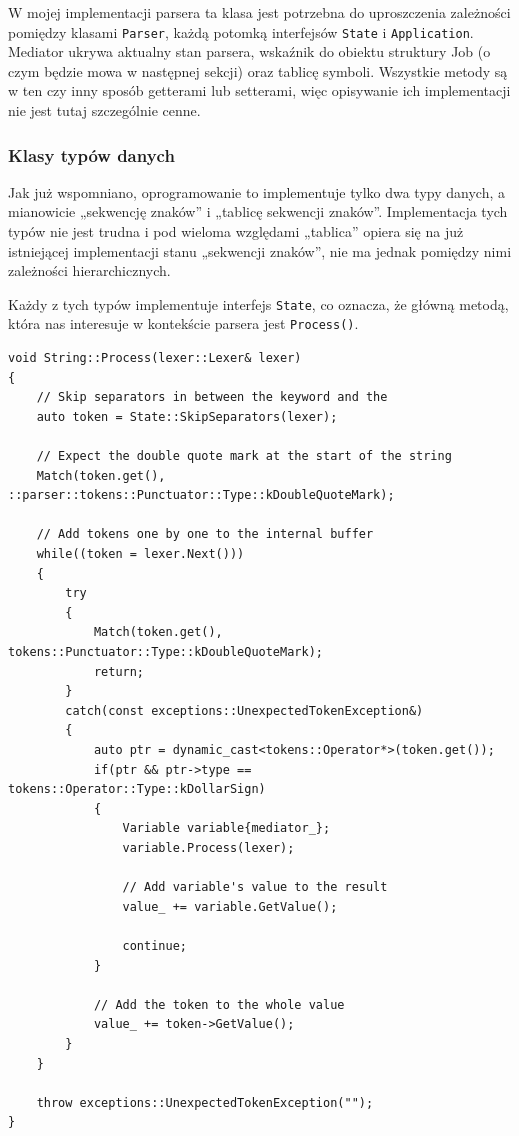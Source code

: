 W mojej implementacji parsera ta klasa jest potrzebna do uproszczenia zależności pomiędzy klasami \texttt{Parser}, każdą potomką interfejsów \texttt{State} i \texttt{Application}. Mediator ukrywa aktualny stan parsera, wskaźnik do obiektu struktury Job (o czym będzie mowa w następnej sekcji) oraz tablicę symboli. Wszystkie metody są w ten czy inny sposób getterami lub setterami, więc opisywanie ich implementacji nie jest tutaj szczególnie cenne.

\subsubsection{Klasy typów danych}

Jak już wspomniano, oprogramowanie to implementuje tylko dwa typy danych, a mianowicie „sekwencję znaków” i „tablicę sekwencji znaków”. Implementacja tych typów nie jest trudna i pod wieloma względami „tablica” opiera się na już istniejącej implementacji stanu „sekwencji znaków”, nie ma jednak pomiędzy nimi zależności hierarchicznych.

Każdy z tych typów implementuje interfejs \texttt{State}, co oznacza, że główną metodą, która nas interesuje w kontekście parsera jest \texttt{Process()}.

\begin{lstlisting}[label=list:string,caption=Metoda String::Process(),basicstyle=\footnotesize\ttfamily]
void String::Process(lexer::Lexer& lexer)
{
    // Skip separators in between the keyword and the
    auto token = State::SkipSeparators(lexer);

    // Expect the double quote mark at the start of the string
    Match(token.get(), ::parser::tokens::Punctuator::Type::kDoubleQuoteMark);
    
    // Add tokens one by one to the internal buffer
    while((token = lexer.Next()))
    {
        try
        {
            Match(token.get(), tokens::Punctuator::Type::kDoubleQuoteMark);
            return;
        }
        catch(const exceptions::UnexpectedTokenException&)
        {
            auto ptr = dynamic_cast<tokens::Operator*>(token.get());
            if(ptr && ptr->type == tokens::Operator::Type::kDollarSign)
            {
                Variable variable{mediator_};
                variable.Process(lexer);
    
                // Add variable's value to the result
                value_ += variable.GetValue();
    
                continue;
            }
    
            // Add the token to the whole value
            value_ += token->GetValue();
        }
    }
    
    throw exceptions::UnexpectedTokenException("");
}
\end{lstlisting}

